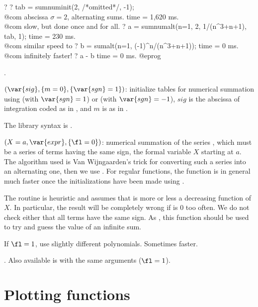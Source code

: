 \bprog
? 
? tab = sumnuminit(2, /*omitted*/, -1); \\@com abscissa $\sigma=2$, alternating sums.
time = 1,620 ms. \\@com slow, but done once and for all.
? a = sumnumalt(n=1, 2, 1/(n^3+n+1), tab, 1);
time = 230 ms. \\@com similar speed to 
? b = sumalt(n=1, (-1)^n/(n^3+n+1));
time = 0 ms. \\@com infinitely faster!
? a - b
time = 0 ms.
@eprog

.

$(\var{sig}, \{m=0\}, \{\var{sgn}=1\})$: \label{se:sumnuminit}initialize tables for numerical summation using  (with
$\var{sgn}=1$) or  (with $\var{sgn}=-1$), $sig$ is the
abscissa of integration coded as in , and $m$ is as in
.

The library syntax is .

$(X=a,\var{expr},\{\fl=0\})$: \label{se:sumpos}numerical summation of the series , which must be a series of
terms having the same sign, the formal variable $X$ starting at $a$. The
algorithm used is Van Wijngaarden's trick for converting such a series into
an alternating one, then we use . For regular functions, the
function  is in general much faster once the initializations
have been made using .

The routine is heuristic and assumes that  is more or less a
decreasing function of $X$. In particular, the result will be completely
wrong if  is 0 too often. We do not check either that all terms
have the same sign. As , this function should be used to
try and guess the value of an infinite sum.

If $\fl=1$, use slightly different polynomials. Sometimes faster.

. Also
available is  with the same arguments ($\fl = 1$).

\section{Plotting functions}

